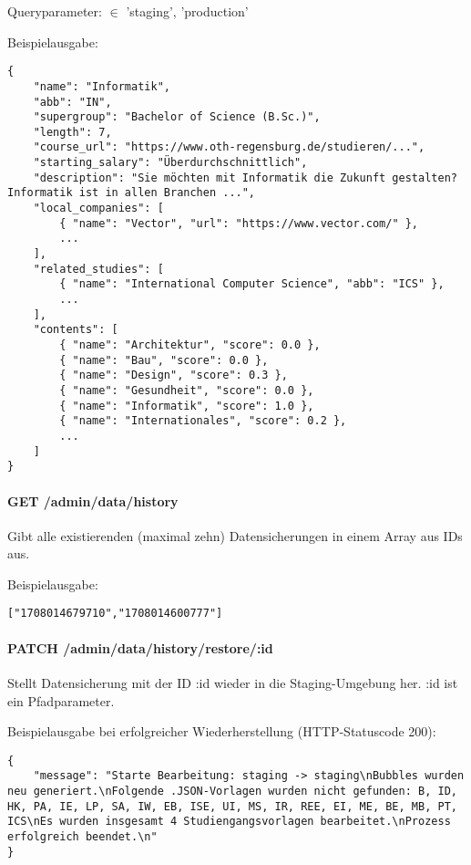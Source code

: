 \noindent
Queryparameter:  $\in$ {'staging', 'production'}

\noindent
Beispielausgabe:

\begin{lstlisting}[style=Python]
{
    "name": "Informatik",
    "abb": "IN",
    "supergroup": "Bachelor of Science (B.Sc.)",
    "length": 7,
    "course_url": "https://www.oth-regensburg.de/studieren/...",
    "starting_salary": "Überdurchschnittlich",
    "description": "Sie möchten mit Informatik die Zukunft gestalten? Informatik ist in allen Branchen ...",
    "local_companies": [
        { "name": "Vector", "url": "https://www.vector.com/" },
        ...
    ],
    "related_studies": [
        { "name": "International Computer Science", "abb": "ICS" },
        ...
    ],
    "contents": [
        { "name": "Architektur", "score": 0.0 },
        { "name": "Bau", "score": 0.0 },
        { "name": "Design", "score": 0.3 },
        { "name": "Gesundheit", "score": 0.0 },
        { "name": "Informatik", "score": 1.0 },
        { "name": "Internationales", "score": 0.2 },
        ...
    ]
}
\end{lstlisting}

\paragraph*{GET /admin/data/history}
\vspace{-1.0em}
Gibt alle existierenden (maximal zehn) Datensicherungen in einem Array aus IDs aus.

\noindent
\begin{minipage}{\linewidth}
Beispielausgabe:
\begin{lstlisting}[style=Python]
    ["1708014679710","1708014600777"]
\end{lstlisting}
\end{minipage}

\paragraph*{PATCH /admin/data/history/restore/:id}
\vspace{-1.0em}
Stellt Datensicherung mit der ID :id wieder in die Staging-Umgebung her. :id ist ein Pfadparameter.

\noindent
Beispielausgabe bei erfolgreicher Wiederherstellung (HTTP-Statuscode 200):
\begin{lstlisting}[style=Python]
{
    "message": "Starte Bearbeitung: staging -> staging\nBubbles wurden neu generiert.\nFolgende .JSON-Vorlagen wurden nicht gefunden: B, ID, HK, PA, IE, LP, SA, IW, EB, ISE, UI, MS, IR, REE, EI, ME, BE, MB, PT, ICS\nEs wurden insgesamt 4 Studiengangsvorlagen bearbeitet.\nProzess erfolgreich beendet.\n"
}
\end{lstlisting}

